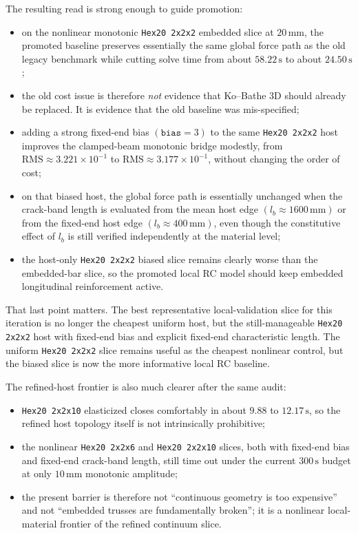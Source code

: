 The resulting read is strong enough to guide promotion:
\begin{itemize}
  \item on the nonlinear monotonic \texttt{Hex20 2x2x2} embedded slice at
    \(20\,\mathrm{mm}\), the promoted baseline preserves essentially the same
    global force path as the old legacy benchmark while cutting solve time from
    about \(58.22\,\mathrm{s}\) to about \(24.50\,\mathrm{s}\);
  \item the old cost issue is therefore \emph{not} evidence that Ko--Bathe 3D
    should already be replaced.  It is evidence that the old baseline was
    mis-specified;
  \item adding a strong fixed-end bias \((\texttt{bias}=3)\) to the same
    \texttt{Hex20 2x2x2} host improves the clamped-beam monotonic bridge
    modestly, from \(\mathrm{RMS}\approx 3.221\times10^{-1}\) to
    \(\mathrm{RMS}\approx 3.177\times10^{-1}\), without changing the order of
    cost;
  \item on that biased host, the global force path is essentially unchanged
    when the crack-band length is evaluated from the mean host edge
    \((l_b \approx 1600\,\mathrm{mm})\) or from the fixed-end host edge
    \((l_b \approx 400\,\mathrm{mm})\), even though the constitutive effect of
    \(l_b\) is still verified independently at the material level;
  \item the host-only \texttt{Hex20 2x2x2} biased slice remains clearly worse
    than the embedded-bar slice, so the promoted local RC model should keep
    embedded longitudinal reinforcement active.
\end{itemize}

That last point matters.  The best representative local-validation slice for
this iteration is no longer the cheapest uniform host, but the still-manageable
\texttt{Hex20 2x2x2} host with fixed-end bias and explicit fixed-end
characteristic length.  The uniform \texttt{Hex20 2x2x2} slice remains useful
as the cheapest nonlinear control, but the biased slice is now the more
informative local RC baseline.

The refined-host frontier is also much clearer after the same audit:
\begin{itemize}
  \item \texttt{Hex20 2x2x10} elasticized closes comfortably in about
    \(9.88\) to \(12.17\,\mathrm{s}\), so the refined host topology itself is
    not intrinsically prohibitive;
  \item the nonlinear \texttt{Hex20 2x2x6} and \texttt{Hex20 2x2x10} slices,
    both with fixed-end bias and fixed-end crack-band length, still time out
    under the current \(300\,\mathrm{s}\) budget at only
    \(10\,\mathrm{mm}\) monotonic amplitude;
  \item the present barrier is therefore not ``continuous geometry is too
    expensive'' and not ``embedded trusses are fundamentally broken''; it is a
    nonlinear local-material frontier of the refined continuum slice.
\end{itemize}

